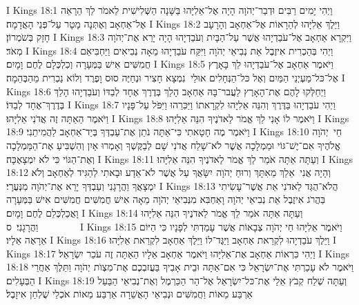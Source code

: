 I Kings 18:1	וַיְהִי יָמִים רַבִּים וּדְבַר־יְהֹוָה הָיָה אֶל־אֵלִיָּהוּ בַּשָּׁנָה הַשְּׁלִישִׁית לֵאמֹר לֵךְ הֵרָאֵה אֶל־אַחְאָב וְאֶתְּנָה מָטָר עַל־פְּנֵי הָאֲדָמָה׃
I Kings 18:2	וַיֵּלֶךְ אֵלִיָּהוּ לְהֵרָאוֹת אֶל־אַחְאָב וְהָרָעָב חָזָק בְּשֹׁמְרוֹן׃
I Kings 18:3	וַיִּקְרָא אַחְאָב אֶל־עֹבַדְיָהוּ אֲשֶׁר עַל־הַבָּיִת וְעֹבַדְיָהוּ הָיָה יָרֵא אֶת־יְהֹוָה מְאֹד׃
I Kings 18:4	וַיְהִי בְּהַכְרִית אִיזֶבֶל אֵת נְבִיאֵי יְהֹוָה וַיִּקַּח עֹבַדְיָהוּ מֵאָה נְבִיאִים וַיַּחְבִּיאֵם חֲמִשִּׁים אִישׁ בַּמְּעָרָה וְכִלְכְּלָם לֶחֶם וָמָיִם׃
I Kings 18:5	וַיֹּאמֶר אַחְאָב אֶל־עֹבַדְיָהוּ לֵךְ בָּאָרֶץ אֶל־כּל־מַעְיְנֵי הַמַּיִם וְאֶל כּל־הַנְּחָלִים אוּלַי  נִמְצָא חָצִיר וּנְחַיֶּה סוּס וָפֶרֶד וְלוֹא נַכְרִית מֵהַבְּהֵמָה׃
I Kings 18:6	וַיְחַלְּקוּ לָהֶם אֶת־הָאָרֶץ לַעֲבר־בָּהּ אַחְאָב הָלַךְ בְּדֶרֶךְ אֶחָד לְבַדּוֹ וְעֹבַדְיָהוּ הָלַךְ בְּדֶרֶךְ־אֶחָד לְבַדּוֹ׃
I Kings 18:7	וַיְהִי עֹבַדְיָהוּ בַּדֶּרֶךְ וְהִנֵּה אֵלִיָּהוּ לִקְרָאתוֹ וַיַּכִּרֵהוּ וַיִּפֹּל עַל־פָּנָיו וַיֹּאמֶר הַאַתָּה זֶה אֲדֹנִי אֵלִיָּהוּ׃
I Kings 18:8	וַיֹּאמֶר לוֹ אָנִי לֵךְ אֱמֹר לַאדֹנֶיךָ הִנֵּה אֵלִיָּהוּ׃
I Kings 18:9	וַיֹּאמֶר מֶה חָטָאתִי כִּי־אַתָּה נֹתֵן אֶת־עַבְדְּךָ בְּיַד־אַחְאָב לַהֲמִיתֵנִי׃
I Kings 18:10	חַי  יְהֹוָה אֱלֹהֶיךָ אִם־יֶשׁ־גּוֹי וּמַמְלָכָה אֲשֶׁר לֹא־שָׁלַח אֲדֹנִי שָׁם לְבַקֶּשְׁךָ וְאָמְרוּ אָיִן וְהִשְׁבִּיעַ אֶת־הַמַּמְלָכָה וְאֶת־הַגּוֹי כִּי לֹא יִמְצָאֶכָּה׃
I Kings 18:11	וְעַתָּה אַתָּה אֹמֵר לֵךְ אֱמֹר לַאדֹנֶיךָ הִנֵּה אֵלִיָּהוּ׃
I Kings 18:12	וְהָיָה אֲנִי  אֵלֵךְ מֵאִתָּךְ וְרוּחַ יְהֹוָה  יִשָּׂאֲךָ עַל אֲשֶׁר לֹא־אֵדָע וּבָאתִי לְהַגִּיד לְאַחְאָב וְלֹא יִמְצָאֲךָ וַהֲרָגָנִי וְעַבְדְּךָ יָרֵא אֶת־יְהֹוָה מִנְּעֻרָי׃
I Kings 18:13	הֲלֹא־הֻגַּד לַאדֹנִי אֵת אֲשֶׁר־עָשִׂיתִי בַּהֲרֹג אִיזֶבֶל אֵת נְבִיאֵי יְהֹוָה וָאַחְבִּא מִנְּבִיאֵי יְהֹוָה מֵאָה אִישׁ חֲמִשִּׁים חֲמִשִּׁים אִישׁ בַּמְּעָרָה וָאֲכַלְכְּלֵם לֶחֶם וָמָיִם׃
I Kings 18:14	וְעַתָּה אַתָּה אֹמֵר לֵךְ אֱמֹר לַאדֹנֶיךָ הִנֵּה אֵלִיָּהוּ וַהֲרָגָנִי׃ {ס}        
I Kings 18:15	וַיֹּאמֶר אֵלִיָּהוּ חַי יְהֹוָה צְבָאוֹת אֲשֶׁר עָמַדְתִּי לְפָנָיו כִּי הַיּוֹם אֵרָאֶה אֵלָיו׃
I Kings 18:16	וַיֵּלֶךְ עֹבַדְיָהוּ לִקְרַאת אַחְאָב וַיַּגֶּד־לוֹ וַיֵּלֶךְ אַחְאָב לִקְרַאת אֵלִיָּהוּ׃
I Kings 18:17	וַיְהִי כִּרְאוֹת אַחְאָב אֶת־אֵלִיָּהוּ וַיֹּאמֶר אַחְאָב אֵלָיו הַאַתָּה זֶה עֹכֵר יִשְׂרָאֵל׃
I Kings 18:18	וַיֹּאמֶר לֹא עָכַרְתִּי אֶת־יִשְׂרָאֵל כִּי אִם־אַתָּה וּבֵית אָבִיךָ בַּעֲזבְכֶם אֶת־מִצְוֺת יְהֹוָה וַתֵּלֶךְ אַחֲרֵי הַבְּעָלִים׃
I Kings 18:19	וְעַתָּה שְׁלַח קְבֹץ אֵלַי אֶת־כּל־יִשְׂרָאֵל אֶל־הַר הַכַּרְמֶל וְאֶת־נְבִיאֵי הַבַּעַל אַרְבַּע מֵאוֹת וַחֲמִשִּׁים וּנְבִיאֵי הָאֲשֵׁרָה אַרְבַּע מֵאוֹת אֹכְלֵי שֻׁלְחַן אִיזָבֶל׃
